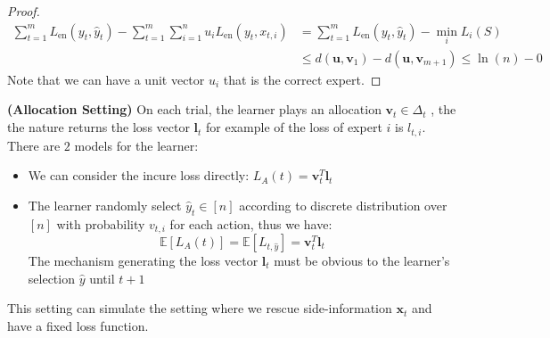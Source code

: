 \begin{proof}
    \begin{equation*}
    \begin{aligned}
        \sum^m_{t=1}L_\text{en}(y_t, \hat{y}_t) - \sum^m_{t=1}\sum^n_{i=1}u_iL_\text{en}(y_t, x_{t, i}) &= \sum^m_{t=1}L_\text{en}(y_t, \hat{y}_t) - \min_i L_i(S) \\
        &\le d(\boldsymbol u, \boldsymbol v_1) - d(\boldsymbol u, \boldsymbol v_{m+1}) \le \ln(n) - 0
    \end{aligned}
    \end{equation*}
    Note that we can have a unit vector $u_i$ that is the correct expert. 
\end{proof}

\begin{definition}{\textbf{(Allocation Setting)}}
    On each trial, the learner plays an allocation $\boldsymbol v_t \in \Delta_t$ , the the nature returns the loss vector $\boldsymbol l_t$ for example of the loss of expert $i$ is $l_{t, i}$. There are $2$ models for the learner:
    \begin{itemize}
        \item We can consider the incure loss directly: $L_A(t) = \boldsymbol v_t^T\boldsymbol l_t$
        \item The learner randomly select $\hat{y}_t \in [n]$ according to discrete distribution over $[n]$ with probability $v_{t, i}$ for each action, thus we have:
        \begin{equation*}
            \mathbb{E}[L_A(t)] = \mathbb{E}[L_{t, \hat{y}}] = \boldsymbol v_t^T\boldsymbol l_t
        \end{equation*}
        The mechanism generating the loss vector $\boldsymbol l_t$ must be obvious to the learner's selection $\hat{y}$ until $t + 1$
    \end{itemize}
    This setting can simulate the setting where we rescue side-information $\boldsymbol x_t$ and have a fixed loss function. 
\end{definition}

